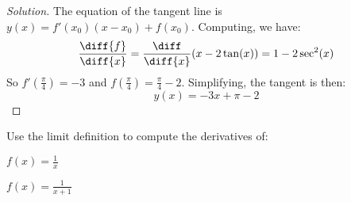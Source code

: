 \documentclass[crop=false,class=book,oneside]{standalone}
\begin{document}
            \begin{proof}[Solution]
                The equation of the tangent line is
                $y(x)=f'(x_{0})(x-x_{0})+f(x_{0})$.
                Computing, we have:
                \begin{equation*}
                    \frac{\diff{f}}{\diff{x}}
                    =\frac{\diff}{\diff{x}}(x-2\tan(x))
                    =1-2\sec^{2}(x)    
                \end{equation*}
                So $f'(\frac{\pi}{4})=-3$ and
                $f(\frac{\pi}{4})=\frac{\pi}{4}-2$.
                Simplifying, the tangent is then:
                \begin{equation*}
                    y(x)=-3x+\pi-2
                \end{equation*}
            \end{proof}
            \begin{problem}
                Use the limit definition to compute
                the derivatives of:
                \begin{enumerate}[label=(\alph*)]
                    \begin{multicols}{2}
                        \item $f(x)=\frac{1}{x}$
                        \item $f(x)=\frac{1}{x+1}$
                    \end{multicols}
                \end{enumerate}
            \end{problem}
\end{document}
